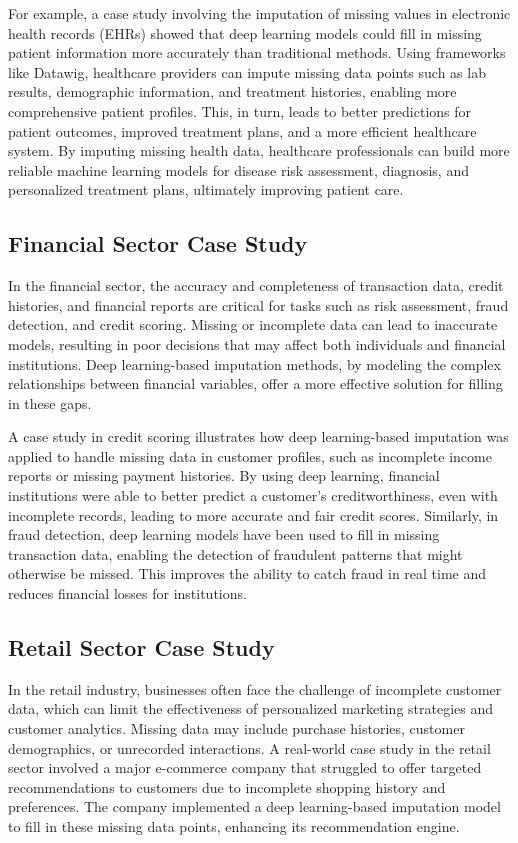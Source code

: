 \documentclass{article}
\begin{document}
For example, a case study involving the imputation of missing values in electronic health records (EHRs) showed that deep learning models could fill in missing patient information more accurately than traditional methods. Using frameworks like Datawig, healthcare providers can impute missing data points such as lab results, demographic information, and treatment histories, enabling more comprehensive patient profiles. This, in turn, leads to better predictions for patient outcomes, improved treatment plans, and a more efficient healthcare system. By imputing missing health data, healthcare professionals can build more reliable machine learning models for disease risk assessment, diagnosis, and personalized treatment plans, ultimately improving patient care.

\subsection{Financial Sector Case Study}
In the financial sector, the accuracy and completeness of transaction data, credit histories, and financial reports are critical for tasks such as risk assessment, fraud detection, and credit scoring. Missing or incomplete data can lead to inaccurate models, resulting in poor decisions that may affect both individuals and financial institutions. Deep learning-based imputation methods, by modeling the complex relationships between financial variables, offer a more effective solution for filling in these gaps.

A case study in credit scoring illustrates how deep learning-based imputation was applied to handle missing data in customer profiles, such as incomplete income reports or missing payment histories. By using deep learning, financial institutions were able to better predict a customer’s creditworthiness, even with incomplete records, leading to more accurate and fair credit scores. Similarly, in fraud detection, deep learning models have been used to fill in missing transaction data, enabling the detection of fraudulent patterns that might otherwise be missed. This improves the ability to catch fraud in real time and reduces financial losses for institutions.

\subsection{Retail Sector Case Study}
In the retail industry, businesses often face the challenge of incomplete customer data, which can limit the effectiveness of personalized marketing strategies and customer analytics. Missing data may include purchase histories, customer demographics, or unrecorded interactions. A real-world case study in the retail sector involved a major e-commerce company that struggled to offer targeted recommendations to customers due to incomplete shopping history and preferences. The company implemented a deep learning-based imputation model to fill in these missing data points, enhancing its recommendation engine.
\end{document}

